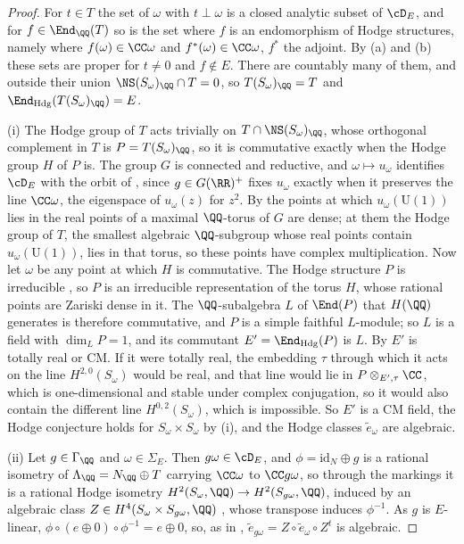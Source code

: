 \begin{proof}
For $t\in T$ the set of $\omega$ with $t\perp\omega$ is a closed analytic
subset of $\cD_{E}$, and for $f\in\End_{\QQ}(T)$ so is the set where $f$ is
an endomorphism of Hodge structures, namely where $f(\omega)\in\CC\omega$ and
$f^{*}(\omega)\in\CC\omega$, $f^{*}$ the adjoint. By (a) and (b) these sets
are proper for $t\ne0$ and $f\notin E$. There are countably many of them, and
outside their union $\NS(S_{\omega})_{\QQ}\cap T=0$, so
$T(S_{\omega})_{\QQ}=T$ and $\End_{\mathrm{Hdg}}(T(S_{\omega})_{\QQ})=E$.

(i) The Hodge group of $T$ acts trivially on $T\cap\NS(S_{\omega})_{\QQ}$,
whose orthogonal complement in $T$ is $P=T(S_{\omega})_{\QQ}$, so it is
commutative exactly when the Hodge group $H$ of $P$ is. The group $G$ is
connected and reductive, and $\omega\mapsto u_{\omega}$ identifies $\cD_{E}$
with the orbit of , since $g\in G(\RR)^{+}$ fixes
$u_{\omega}$ exactly when it preserves the line $\CC\omega$, the eigenspace
of $u_{\omega}(z)$ for $z^{2}$. By  the points at which
$u_{\omega}(\mathrm{U}(1))$ lies in the real points of a maximal $\QQ$-torus of
$G$ are dense; at them the Hodge group of $T$, the smallest algebraic
$\QQ$-subgroup whose real points contain $u_{\omega}(\mathrm{U}(1))$, lies in
that torus, so these points have complex multiplication. Now let $\omega$ be
any point at which $H$ is commutative. The Hodge structure $P$ is
irreducible \cite{Zar83}, so $P$ is an irreducible representation of the
torus $H$, whose rational points are Zariski dense in it. The
$\QQ$-subalgebra $L$ of $\End(P)$ that $H(\QQ)$ generates is therefore
commutative, and $P$ is a simple faithful $L$-module; so $L$ is a field with
$\dim_{L}P=1$, and its commutant $E'=\End_{\mathrm{Hdg}}(P)$ is $L$. By
\cite{Zar83} $E'$ is totally real or CM. If it were totally real, the
embedding $\tau$ through which it acts on the line $H^{2,0}(S_{\omega})$
would be real, and that line would lie in $P\otimes_{E',\tau}\CC$, which is
one-dimensional and stable under complex conjugation, so it would also
contain the different line $H^{0,2}(S_{\omega})$, which is impossible. So
$E'$ is a CM field, the Hodge conjecture
holds for $S_{\omega}\times S_{\omega}$ by (i), and the
Hodge classes $\tilde e_{\omega}$ are algebraic.

(ii) Let $g\in\Gamma_{\QQ}$ and $\omega\in\Sigma_{E}$. Then $g\omega\in\cD_{E}$,
and $\phi=\mathrm{id}_{N}\oplus g$ is a rational isometry of
$\Lambda_{\QQ}=N_{\QQ}\oplus T$ carrying $\CC\omega$ to $\CC g\omega$, so
through the markings it is a rational Hodge isometry
$H^{2}(S_{\omega},\QQ)\to H^{2}(S_{g\omega},\QQ)$, induced by an algebraic
class $Z\in H^{4}(S_{\omega}\times S_{g\omega},\QQ)$ \cite{Bus19}, whose
transpose induces $\phi^{-1}$. As $g$ is $E$-linear,
$\phi\circ(e\oplus0)\circ\phi^{-1}=e\oplus0$, so, as in ,
$\tilde e_{g\omega}=Z\circ\tilde e_{\omega}\circ Z^{t}$ is algebraic.


\end{proof}
